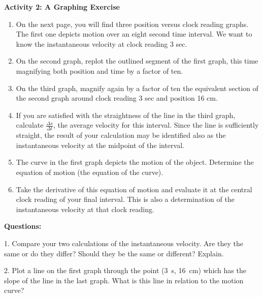 {\noindent \bf Activity 2: A Graphing Exercise} \begin{enumerate}

\item On the next page, you will find three position versus clock reading graphs. The first one depicts motion over an eight second time interval. We want to know the instantaneous velocity at clock reading 3 sec.

\item On the second graph, replot the outlined segment of the first graph, this time magnifying both position and time by a factor of ten.

\item On the third graph, magnify again by a factor of ten the equivalent section of the second graph around clock reading 3 sec and position 16 cm. 

\item If you are satisfied with the straightness of the line in the third graph, calculate $\frac{\Delta s}{\Delta t}$, the average velocity for this interval. Since the line is sufficiently straight, the result of your calculation may be identified also as the instantaneous velocity at the midpoint of the interval.

\item The curve in the first graph depicts the motion of the object. Determine the equation of motion (the equation of the curve).

\item Take the derivative of this equation of motion and evaluate it at the central clock reading of your final interval. This is also a determination of the instantaneous velocity at that clock reading.

\end{enumerate}

\medskip

{\noindent \bf Questions:}

1. Compare your two calculations of the instantaneous velocity. Are they the
same or do they differ? Should they be the same or different? Explain. 
\answerspace{20mm}

2. Plot a line on the first graph through the point (3~s, 16~cm) which has the
slope of the line in the last graph. What is this line in relation to the motion
curve?
\answerspace{20mm}

